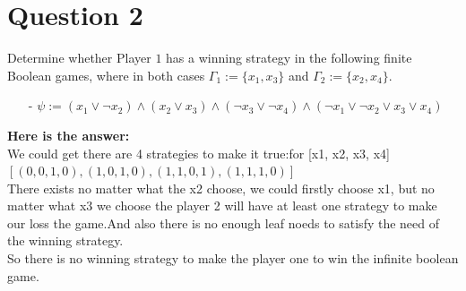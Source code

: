 \documentclass{article}
\begin{document}
    \section{Question 2}
    Determine whether Player $1$ has a winning strategy in the following finite Boolean games, where in both cases $\Gamma_{1}:=\{x_1, x_3\}$ and $\Gamma_{2}:=\{x_2, x_4\}$.
    \begin{itemize}
        \item[-] $\psi :=(x_{1}\vee\neg x_{2})\wedge(x_{2}\vee x_{3})\wedge(\neg x_{3}\vee\neg x_{4})\wedge(\neg x_{1}\vee \neg x_{2}\vee x_{3}\vee x_{4})$
    \end{itemize}
    \textbf{Here is the answer:}\\
    We could get there are 4 strategies to make it true:for [x1, x2, x3, x4]\\
    $[(0, 0, 1, 0), (1, 0, 1, 0), (1, 1, 0, 1), (1, 1, 1, 0)]$ \\
    There exists no matter what the x2 choose, we could firstly choose x1, but no matter what x3 we choose the player 2 will have at least one strategy to make our loss the game.And also there is no enough leaf noeds to satisfy the need of the winning strategy.\\
    So there is no winning strategy to make the player one to win the infinite boolean game.\\
\end{document}

